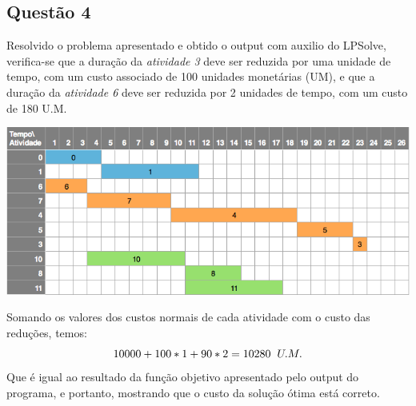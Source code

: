 \documentclass[11pt,titlepage,contentspage,a4paper]{article} %
\begin{document}
\subsection{Questão 4}

Resolvido o problema apresentado e obtido o output com auxilio do LPSolve, verifica-se que a duração da \textit{atividade 3} deve ser reduzida por uma unidade de tempo, com um custo associado de 100 unidades monetárias (UM), e que a duração da \textit{atividade 6} deve ser reduzida por 2 unidades de tempo, com um custo de 180 U.M.


\begin{center}
\includegraphics[width=\textwidth]{gant2}
\end{center}



Somando os valores dos custos normais de cada atividade com o custo das reduções, temos:	
		$$10000 + 100*1 + 90*2 = 10280 \hspace {0.2cm}U.M. $$
Que é igual ao resultado da função objetivo apresentado pelo output do programa, e portanto, mostrando que o custo da solução ótima está correto.



\end{document}
